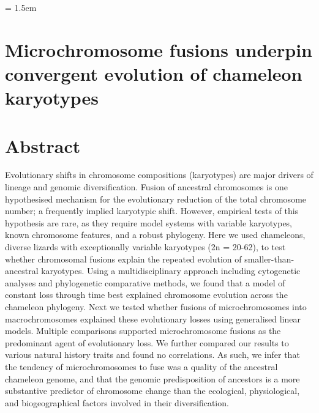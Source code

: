 \documentclass[a4paper, 12pt]{article}
\begin{document}
\modulolinenumbers[1]   %


\parindent = 1.5em
\addtolength{\parskip}{.9em}

\raggedright


\section{Microchromosome fusions underpin convergent evolution of chameleon karyotypes}


\section{Abstract}

Evolutionary shifts in chromosome compositions (karyotypes) are major drivers of lineage and genomic diversification. 
Fusion of ancestral chromosomes is one hypothesised mechanism for the evolutionary reduction of the total chromosome number; a frequently implied karyotypic shift. 
However, empirical tests of this hypothesis are rare, as they require model systems with variable karyotypes, known chromosome features, and a robust phylogeny. 
Here we used chameleons, diverse lizards with exceptionally variable karyotypes (2n = 20-62), to test whether chromosomal fusions explain the repeated evolution of smaller-than-ancestral karyotypes. 
Using a multidisciplinary approach including cytogenetic analyses and phylogenetic comparative methods, we found that a model of constant loss through time best explained chromosome evolution across the chameleon phylogeny. 
Next we tested whether fusions of microchromosomes into macrochromosomes explained these evolutionary losses using generalised linear models. 
Multiple comparisons supported microchromosome fusions as the predominant agent of evolutionary loss. 
We further compared our results to various natural history traits and found no correlations. 
As such, we infer that the tendency of microchromosomes to fuse was a quality of the ancestral chameleon genome, and that the genomic predisposition of ancestors is a more substantive predictor of chromosome change than the ecological, physiological, and biogeographical factors involved in their diversification.
\end{document}
